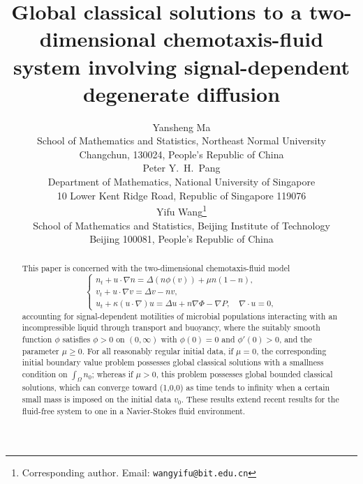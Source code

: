 \documentclass[12pt]{article}
\theoremstyle{plain}
\theoremstyle{definition}
\numberwithin{equation}{section}
\begin{document}
\title{Global classical solutions to
 a  two-dimensional chemotaxis-fluid system involving signal-dependent degenerate diffusion}

\author{Yansheng Ma\\
School of Mathematics and Statistics, Northeast Normal University\\
Changchun, 130024, People's Republic of China
\\
  Peter Y.~H.~Pang\\
Department of Mathematics, National University of Singapore\\
10 Lower Kent Ridge Road, Republic of Singapore 119076
\\
Yifu Wang\thanks{
Corresponding author. Email: {\tt wangyifu@bit.edu.cn}}\\
School of Mathematics and Statistics, Beijing
Institute of Technology\\
Beijing 100081, People's Republic of China}
\date{}
\maketitle
\vspace{0.0cm}
\noindent
\begin{abstract}
This paper is concerned with the two-dimensional chemotaxis-fluid model
\begin{equation*}
\begin{cases}
n_t+u\cdot\nabla n=\Delta (n\phi(v))+\mu n(1-n),\\
v_t+u\cdot\nabla v=\Delta v-nv,\\
u_t+ \kappa (u\cdot\nabla) u=\Delta u+n\nabla\Phi-\nabla P, \quad\nabla\cdot u=0,
\end{cases}
\end{equation*}
  accounting for signal-dependent motilities of microbial populations
 interacting with  an incompressible liquid  through transport and buoyancy, where the suitably smooth function $\phi$ satisfies $\phi>0$ on $(0,\infty)$ with $\phi(0)=0$ and $\phi'(0)>0$, and the parameter $\mu\geq 0$.
For all reasonably regular initial data, if $\mu=0$,
the  corresponding initial boundary value problem possesses  global classical solutions with a smallness condition on $\int_\Omega n_0$; whereas  if $\mu>0$, this problem possesses global bounded classical solutions, which can converge toward (1,0,0) as time tends to infinity when a
certain small mass is imposed on the initial data $v_0$. These results extend recent results for the fluid-free system to one in a Navier-Stokes fluid environment.

\end{abstract}
\end{document}
